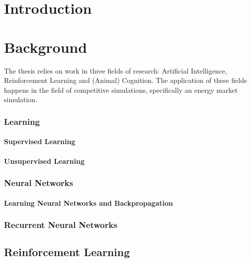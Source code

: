 \chapter{Introduction}



\chapter{Background}
The thesis relies on work in three fields of research: Artificial Intelligence, Reinforcement Learning and (Animal)
Cognition. The application of these fields happens in the field of competitive simulations, specifically an energy
market simulation. 


\subsection{Learning}

\subsubsection{Supervised Learning}

\subsubsection{Unsupervised Learning}

\subsection{Neural Networks}%
\label{sec:neural_networks}

\subsubsection{Learning Neural Networks and Backpropagation}
\label{sec:Backpropagation}


\subsection{Recurrent Neural Networks}%
\label{sec:recurrent_neural_networks}


\section{Reinforcement Learning}


